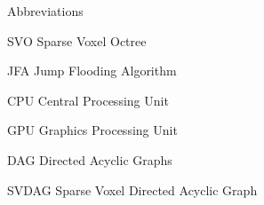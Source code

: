 \begin{dictionary}{Abbreviations}
    \item[SVO] Sparse Voxel Octree
    \item[JFA] Jump Flooding Algorithm
    \item[CPU] Central Processing Unit
    \item[GPU] Graphics Processing Unit
    \item[DAG] Directed Acyclic Graphs
    \item[SVDAG] Sparse Voxel Directed Acyclic Graph
\end{dictionary}
